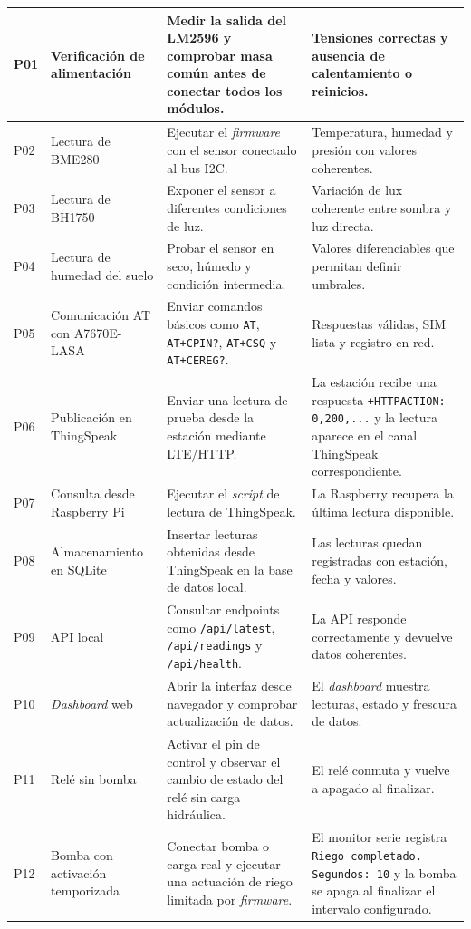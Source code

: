 \begin{longtable}{|
>{\centering\arraybackslash}p{}|
>{\raggedright\arraybackslash}p{}|
>{\raggedright\arraybackslash}p{}|
>{\raggedright\arraybackslash}p{}|}
P01 & Verificación de alimentación & Medir la salida del LM2596 y comprobar masa común antes de conectar todos los módulos. & Tensiones correctas y ausencia de calentamiento o reinicios. \\
\hline
P02 & Lectura de BME280 & Ejecutar el \textit{firmware} con el sensor conectado al bus I2C. & Temperatura, humedad y presión con valores coherentes. \\
\hline
P03 & Lectura de BH1750 & Exponer el sensor a diferentes condiciones de luz. & Variación de lux coherente entre sombra y luz directa. \\
\hline
P04 & Lectura de humedad del suelo & Probar el sensor en seco, húmedo y condición intermedia. & Valores diferenciables que permitan definir umbrales. \\
\hline
P05 & Comunicación AT con A7670E-LASA & Enviar comandos básicos como \texttt{AT}, \texttt{AT+CPIN?}, \texttt{AT+CSQ} y \texttt{AT+CEREG?}. & Respuestas válidas, SIM lista y registro en red. \\
\hline
P06 & Publicación en ThingSpeak & Enviar una lectura de prueba desde la estación mediante LTE/HTTP. & La estación recibe una respuesta \texttt{+HTTPACTION: 0,200,...} y la lectura aparece en el canal ThingSpeak correspondiente. \\
\hline
P07 & Consulta desde Raspberry Pi & Ejecutar el \textit{script} de lectura de ThingSpeak. & La Raspberry recupera la última lectura disponible. \\
\hline
P08 & Almacenamiento en SQLite & Insertar lecturas obtenidas desde ThingSpeak en la base de datos local. & Las lecturas quedan registradas con estación, fecha y valores. \\
\hline
P09 & API local & Consultar endpoints como \texttt{/api/latest}, \texttt{/api/readings} y \texttt{/api/health}. & La API responde correctamente y devuelve datos coherentes. \\
\hline
P10 & \textit{Dashboard} web & Abrir la interfaz desde navegador y comprobar actualización de datos. & El \textit{dashboard} muestra lecturas, estado y frescura de datos. \\
\hline
P11 & Relé sin bomba & Activar el pin de control y observar el cambio de estado del relé sin carga hidráulica. & El relé conmuta y vuelve a apagado al finalizar. \\
\hline
P12 & Bomba con activación temporizada & Conectar bomba o carga real y ejecutar una actuación de riego limitada por \textit{firmware}. & El monitor serie registra \texttt{Riego completado. Segundos: 10} y la bomba se apaga al finalizar el intervalo configurado. \\

\end{longtable}
